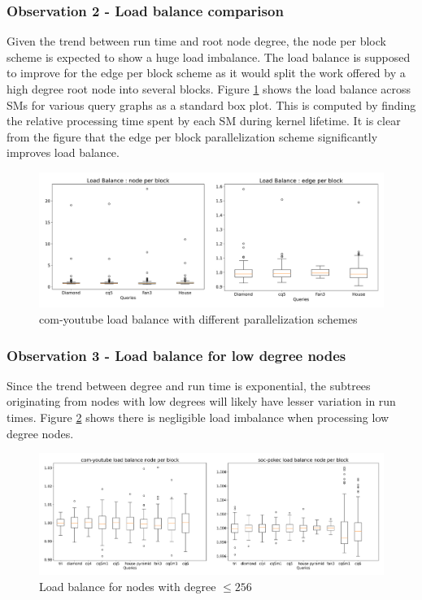 \subsubsection*{Observation 2 - Load balance comparison}
Given the trend between run time and root node degree, the node per block scheme is expected to show a huge load imbalance.
The load balance is supposed to improve for the edge per block scheme as it would split the work offered by a high degree root node into several blocks.
Figure \ref{fig:load-balance-baseline} shows the load balance across SMs for various query graphs as a standard box plot.
This is computed by finding the relative processing time spent by each SM during kernel lifetime.
It is clear from the figure that the edge per block parallelization scheme significantly improves load balance.
\begin{figure}
    \includegraphics[width=\textwidth]{fig/improvements/yt_lb-baseline_byedge.png}
    \caption{com-youtube load balance with different parallelization schemes}
    \label{fig:load-balance-baseline}
\end{figure}

\subsubsection*{Observation 3 - Load balance for low degree nodes}
Since the trend between degree and run time is exponential, the subtrees originating from nodes with low degrees will likely have lesser variation in run times.
Figure \ref{fig:load-balance-LD} shows there is negligible load imbalance when processing low degree nodes.
\begin{figure}
    \includegraphics[width=\textwidth]{fig/improvements/load-balance-LD.png}
    \caption{Load balance for nodes with degree $\leq 256$ }
    \label{fig:load-balance-LD}
\end{figure}

